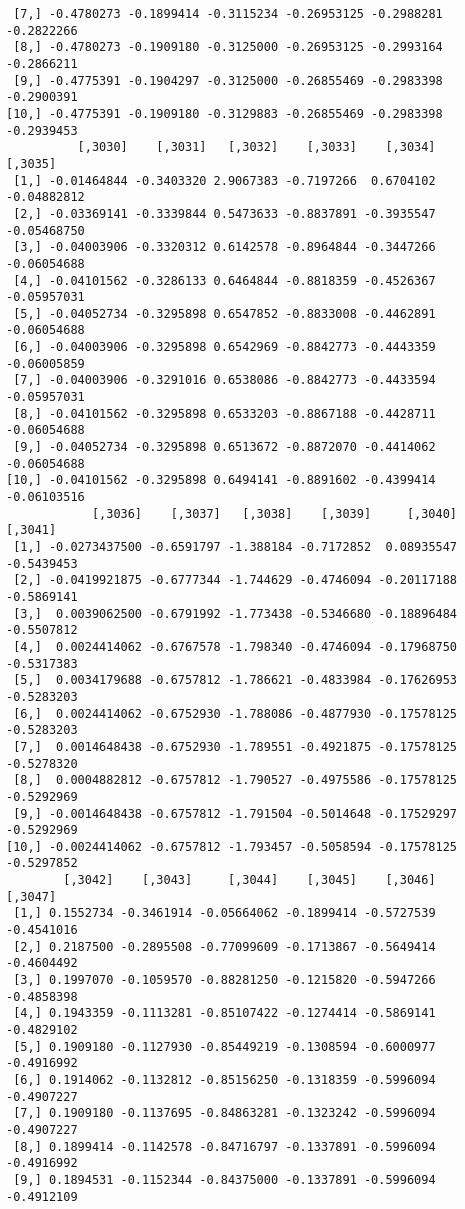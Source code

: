\documentclass[
  letterpaper,
  DIV=11,
  numbers=noendperiod]{scrreprt}
\begin{document}
\begin{verbatim}
 [7,] -0.4780273 -0.1899414 -0.3115234 -0.26953125 -0.2988281 -0.2822266
 [8,] -0.4780273 -0.1909180 -0.3125000 -0.26953125 -0.2993164 -0.2866211
 [9,] -0.4775391 -0.1904297 -0.3125000 -0.26855469 -0.2983398 -0.2900391
[10,] -0.4775391 -0.1909180 -0.3129883 -0.26855469 -0.2983398 -0.2939453
          [,3030]    [,3031]   [,3032]    [,3033]    [,3034]     [,3035]
 [1,] -0.01464844 -0.3403320 2.9067383 -0.7197266  0.6704102 -0.04882812
 [2,] -0.03369141 -0.3339844 0.5473633 -0.8837891 -0.3935547 -0.05468750
 [3,] -0.04003906 -0.3320312 0.6142578 -0.8964844 -0.3447266 -0.06054688
 [4,] -0.04101562 -0.3286133 0.6464844 -0.8818359 -0.4526367 -0.05957031
 [5,] -0.04052734 -0.3295898 0.6547852 -0.8833008 -0.4462891 -0.06054688
 [6,] -0.04003906 -0.3295898 0.6542969 -0.8842773 -0.4443359 -0.06005859
 [7,] -0.04003906 -0.3291016 0.6538086 -0.8842773 -0.4433594 -0.05957031
 [8,] -0.04101562 -0.3295898 0.6533203 -0.8867188 -0.4428711 -0.06054688
 [9,] -0.04052734 -0.3295898 0.6513672 -0.8872070 -0.4414062 -0.06054688
[10,] -0.04101562 -0.3295898 0.6494141 -0.8891602 -0.4399414 -0.06103516
            [,3036]    [,3037]   [,3038]    [,3039]     [,3040]    [,3041]
 [1,] -0.0273437500 -0.6591797 -1.388184 -0.7172852  0.08935547 -0.5439453
 [2,] -0.0419921875 -0.6777344 -1.744629 -0.4746094 -0.20117188 -0.5869141
 [3,]  0.0039062500 -0.6791992 -1.773438 -0.5346680 -0.18896484 -0.5507812
 [4,]  0.0024414062 -0.6767578 -1.798340 -0.4746094 -0.17968750 -0.5317383
 [5,]  0.0034179688 -0.6757812 -1.786621 -0.4833984 -0.17626953 -0.5283203
 [6,]  0.0024414062 -0.6752930 -1.788086 -0.4877930 -0.17578125 -0.5283203
 [7,]  0.0014648438 -0.6752930 -1.789551 -0.4921875 -0.17578125 -0.5278320
 [8,]  0.0004882812 -0.6757812 -1.790527 -0.4975586 -0.17578125 -0.5292969
 [9,] -0.0014648438 -0.6757812 -1.791504 -0.5014648 -0.17529297 -0.5292969
[10,] -0.0024414062 -0.6757812 -1.793457 -0.5058594 -0.17578125 -0.5297852
        [,3042]    [,3043]     [,3044]    [,3045]    [,3046]    [,3047]
 [1,] 0.1552734 -0.3461914 -0.05664062 -0.1899414 -0.5727539 -0.4541016
 [2,] 0.2187500 -0.2895508 -0.77099609 -0.1713867 -0.5649414 -0.4604492
 [3,] 0.1997070 -0.1059570 -0.88281250 -0.1215820 -0.5947266 -0.4858398
 [4,] 0.1943359 -0.1113281 -0.85107422 -0.1274414 -0.5869141 -0.4829102
 [5,] 0.1909180 -0.1127930 -0.85449219 -0.1308594 -0.6000977 -0.4916992
 [6,] 0.1914062 -0.1132812 -0.85156250 -0.1318359 -0.5996094 -0.4907227
 [7,] 0.1909180 -0.1137695 -0.84863281 -0.1323242 -0.5996094 -0.4907227
 [8,] 0.1899414 -0.1142578 -0.84716797 -0.1337891 -0.5996094 -0.4916992
 [9,] 0.1894531 -0.1152344 -0.84375000 -0.1337891 -0.5996094 -0.4912109

\end{verbatim}
\end{document}
